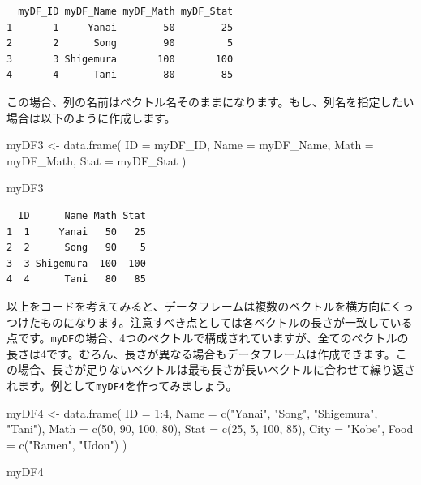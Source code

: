 \documentclass[
  a4paper,
  pandoc,
  ja=standard,
  jafont=haranoaji]{bxjsbook}
\newenvironment{Shaded}{\begin{snugshade}}{\end{snugshade}}
\newcommand{\AttributeTok}[1]{\textcolor[rgb]{0.00,0.48,0.65}{#1}}
\newcommand{\DecValTok}[1]{\textcolor[rgb]{0.68,0.00,0.00}{#1}}
\newcommand{\FunctionTok}[1]{\textcolor[rgb]{0.28,0.35,0.67}{#1}}
\newcommand{\NormalTok}[1]{\textcolor[rgb]{0.00,0.48,0.65}{#1}}
\newcommand{\OtherTok}[1]{\textcolor[rgb]{0.00,0.48,0.65}{#1}}
\newcommand{\SpecialCharTok}[1]{\textcolor[rgb]{0.37,0.37,0.37}{#1}}
\newcommand{\StringTok}[1]{\textcolor[rgb]{0.13,0.47,0.30}{#1}}
\begin{document}
\begin{verbatim}
  myDF_ID myDF_Name myDF_Math myDF_Stat
1       1     Yanai        50        25
2       2      Song        90         5
3       3 Shigemura       100       100
4       4      Tani        80        85
\end{verbatim}

この場合、列の名前はベクトル名そのままになります。もし、列名を指定したい場合は以下のように作成します。

\begin{Shaded}
\begin{Highlighting}[numbers=left,,]
\NormalTok{myDF3 }\OtherTok{\textless{}{-}} \FunctionTok{data.frame}\NormalTok{(}
    \AttributeTok{ID   =}\NormalTok{ myDF\_ID, }
    \AttributeTok{Name =}\NormalTok{ myDF\_Name, }
    \AttributeTok{Math =}\NormalTok{ myDF\_Math, }
    \AttributeTok{Stat =}\NormalTok{ myDF\_Stat}
\NormalTok{    )}

\NormalTok{myDF3}
\end{Highlighting}
\end{Shaded}

\begin{verbatim}
  ID      Name Math Stat
1  1     Yanai   50   25
2  2      Song   90    5
3  3 Shigemura  100  100
4  4      Tani   80   85
\end{verbatim}

以上をコードを考えてみると、データフレームは複数のベクトルを横方向にくっつけたものになります。注意すべき点としては各ベクトルの長さが一致している点です。\texttt{myDF}の場合、4つのベクトルで構成されていますが、全てのベクトルの長さは4です。むろん、長さが異なる場合もデータフレームは作成できます。この場合、長さが足りないベクトルは最も長さが長いベクトルに合わせて繰り返されます。例として\texttt{myDF4}を作ってみましょう。

\begin{Shaded}
\begin{Highlighting}[numbers=left,,]
\NormalTok{myDF4 }\OtherTok{\textless{}{-}} \FunctionTok{data.frame}\NormalTok{(}
    \AttributeTok{ID   =} \DecValTok{1}\SpecialCharTok{:}\DecValTok{4}\NormalTok{,}
    \AttributeTok{Name =} \FunctionTok{c}\NormalTok{(}\StringTok{"Yanai"}\NormalTok{, }\StringTok{"Song"}\NormalTok{, }\StringTok{"Shigemura"}\NormalTok{, }\StringTok{"Tani"}\NormalTok{),}
    \AttributeTok{Math =} \FunctionTok{c}\NormalTok{(}\DecValTok{50}\NormalTok{, }\DecValTok{90}\NormalTok{, }\DecValTok{100}\NormalTok{, }\DecValTok{80}\NormalTok{),}
    \AttributeTok{Stat =} \FunctionTok{c}\NormalTok{(}\DecValTok{25}\NormalTok{, }\DecValTok{5}\NormalTok{, }\DecValTok{100}\NormalTok{, }\DecValTok{85}\NormalTok{),}
    \AttributeTok{City =} \StringTok{"Kobe"}\NormalTok{,}
    \AttributeTok{Food =} \FunctionTok{c}\NormalTok{(}\StringTok{"Ramen"}\NormalTok{, }\StringTok{"Udon"}\NormalTok{)}
\NormalTok{    )}

\NormalTok{myDF4}
\end{Highlighting}
\end{Shaded}
\end{document}
